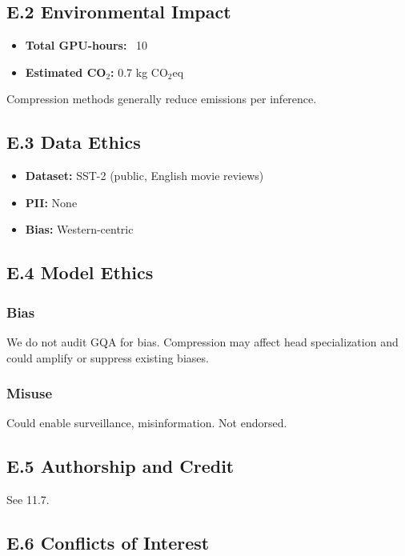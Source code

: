 \subsection{E.2 Environmental Impact}

\begin{itemize}
\item \textbf{Total GPU-hours:} ~10
\item \textbf{Estimated CO$_2$:} 0.7 kg CO$_2$eq

\end{itemize}
Compression methods generally reduce emissions per inference.

\subsection{E.3 Data Ethics}

\begin{itemize}
\item \textbf{Dataset:} SST-2 (public, English movie reviews)
\item \textbf{PII:} None
\item \textbf{Bias:} Western-centric

\end{itemize}
\subsection{E.4 Model Ethics}

\subsubsection{Bias}

We do not audit GQA for bias. Compression may affect head specialization 
and could amplify or suppress existing biases.

\subsubsection{Misuse}

Could enable surveillance, misinformation. Not endorsed.

\subsection{E.5 Authorship and Credit}

See  11.7.

\subsection{E.6 Conflicts of Interest}

